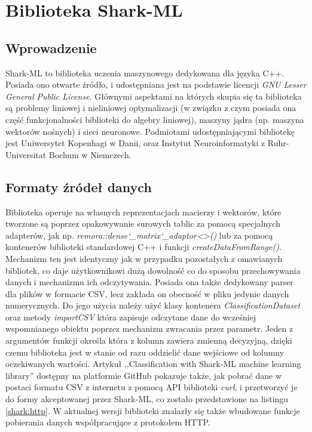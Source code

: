\chapter{Biblioteka Shark-ML}

\section{Wprowadzenie}

Shark-ML to biblioteka uczenia maszynowego dedykowana dla języka C++. Posiada ono otwarte źródło, i udostępniana jest na podstawie licencji \textit{GNU Lesser General Public License}. Głównymi aspektami na których skupia się ta biblioteka są problemy liniowej i nieliniowej optymalizacji (w związku z czym posiada ona część funkcjonalności biblioteki do algebry liniowej), maszyny jądra (np. maszyna wektorów nośnych) i sieci neuronowe. \cite{shark} Podmiotami udostępniającymi bibliotekę jest Uniwersytet Kopenhagi w Danii, oraz Instytut Neuroinformatyki z Ruhr-Universitat Bochum w Niemczech.

\section{Formaty źródeł danych}

Biblioteka operuje na własnych reprezentacjach macierzy i wektorów, które tworzone są poprzez opakowywanie surowych tablic za pomocą specjalnych adapterów, jak np. \textit{remora::dense\char`_matrix\char`_adaptor<>()} lub za pomocą kontenerów biblioteki standardowej C++ i funkcji \textit{createDataFromRange()}. Mechanizm ten jest identyczny jak w przypadku pozostałych z omawianych bibliotek, co daje użytkownikowi dużą dowolność co do sposobu przechowywania danych i mechanizmu ich odczytywania. Posiada ona także dedykowany parser dla plików w formacie CSV, lecz zakłada on obecność w pliku jedynie danych numerycznych. Do jego użycia należy użyć klasy kontenera \textit{ClassificationDataset} oraz metody \textit{importCSV} która zapisuje odczytane dane do wcześniej wspomnianego obiektu poprzez mechanizm zwracania przez parametr. Jeden z argumentów funkcji określa która z kolumn zawiera zmienną decyzyjną, dzięki czemu biblioteka jest w stanie od razu oddzielić dane wejściowe od kolumny oczekiwanych wartości. Artykuł ,,Classification with Shark-ML machine learning library''\cite{shark:http} dostępny na platformie GitHub pokazuje także, jak pobrać dane w postaci formatu CSV z internetu z pomocą API biblioteki \textit{curl}, i przetworzyć je do formy akceptowanej przez Shark-ML, co zostało przedstawione na listingu \ref{shark:http}. W aktualnej wersji biblioteki znalazły się także wbudowane funkcje pobierania danych współpracujące z protokołem HTTP.

